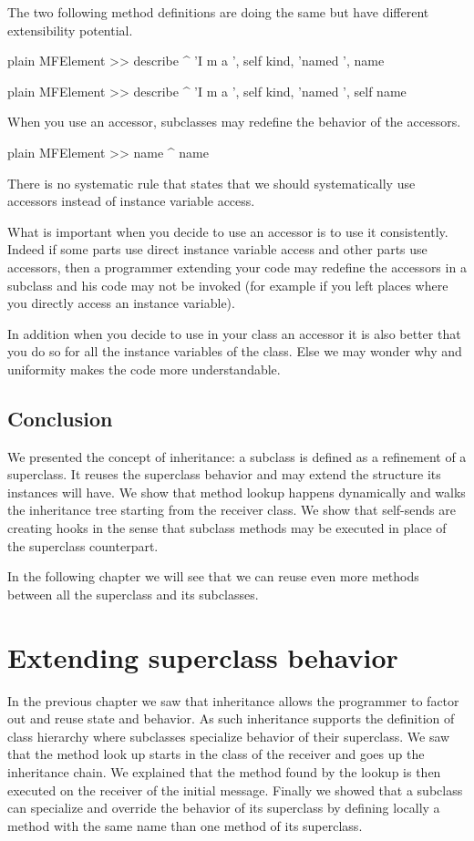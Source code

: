 \documentclass[10pt,twoside,english]{_support/latex/sbabook/sbabook}
\begin{document}
The two following method definitions are doing the same but have different extensibility potential.

\begin{displaycode}{plain}
MFElement >> describe
	^ 'I m a ', self kind, 'named ', name  
\end{displaycode}

\begin{displaycode}{plain}
MFElement >> describe
	^ 'I m a ', self kind, 'named ', self name  
\end{displaycode}

When you use an accessor, subclasses may redefine the behavior of the accessors.

\begin{displaycode}{plain}
MFElement >> name
	^ name
\end{displaycode}

There is no systematic rule that states that we should systematically use accessors instead of instance variable access. 

What is important when you decide to use an accessor is to use it consistently. Indeed 
if some parts use direct instance variable access and other parts use accessors, then a programmer extending your code may redefine the accessors in a subclass and his code may not be invoked (for example if you left places where you directly access an instance variable).

In addition when you decide to use in your class an accessor it is also better that you do so for all the instance variables of the class. Else we may wonder why and uniformity makes the code more understandable.
\section{Conclusion}
We presented the concept of inheritance: a subclass is defined as a refinement of a superclass. It reuses the superclass behavior and may extend the structure its instances will have. We show that method lookup happens dynamically and walks the inheritance tree starting from the receiver class.
We show that self-sends are creating hooks in the sense that subclass methods may be executed in place of the superclass counterpart. 

In the following chapter we will see that we can reuse even more methods between all the superclass and its subclasses.

\chapter{Extending superclass behavior}
In the previous chapter we saw that inheritance allows the programmer to factor out and reuse state and behavior. As such inheritance supports the definition of class hierarchy where subclasses specialize behavior of their superclass. We saw that the method look up starts in the class of the receiver and goes up the inheritance chain. We explained that the method found by the lookup is then executed on the receiver of the initial message.
Finally we showed that a subclass can specialize and override the behavior of its superclass by defining locally a method with the same name than one method of its superclass. 
\end{document}
